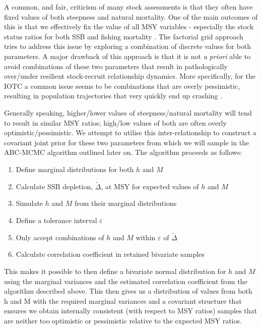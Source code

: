 \documentclass[11pt]{article}
\newcommand{\veps}{\varepsilon}
\begin{document}
A common, and fair, criticism of many stock assessments is that they often have fixed values of both steepness and natural mortality. One of the main outcomes of this is that we effectively fix the value of all MSY variables - especially the stock status ratios for both SSB and fishing mortality \cite{steepm}. The factorial grid approach tries to address this issue by exploring a combination of discrete values for both parameters. A major drawback of this approach is that it is not \textit{a priori} able to avoid combinations of these two parameters that result in pathologically over/under resilient stock-recruit relationship dynamics. More specifically, for the IOTC a common issue seems to be combinations that are overly pessimistic, resulting in population trajectories that very quickly end up crashing \cite{alb}.

Generally speaking, higher/lower values of steepness/natural mortality will tend to result in similar MSY ratios; high/low values of both are often overly optimistic/pessimistic. We attempt to utilise this inter-relationship to construct a covariant joint prior for these two parameters from which we will sample in the ABC-MCMC algorithm outlined later on. The algorithm proceeds as follows:

\begin{enumerate}
    \item Define marginal distributions for both $h$ and $M$
    \item Calculate SSB depletion, $\tilde{\Delta}$, at MSY for expected values of $h$ and $M$
    \item Simulate $h$ and $M$ from their marginal distributions
    \item Define a tolerance interval $\veps$
    \item Only accept combinations of $h$ and $M$ within $\veps$ of $\tilde{\Delta}$
    \item Calculate correlation coefficient in retained bivariate samples
\end{enumerate}

This makes it possible to then define a bivariate normal distribution for $h$ and $M$ using the marginal variances and the estimated correlation coefficient from the algorithm described above. This then gives us a distribution of values from both h and M with the required marginal variances and a covariant structure that ensures we obtain internally consistent (with respect to MSY ratios) samples that are neither too optimistic or pessimistic relative to the expected MSY ratios.
\end{document}
